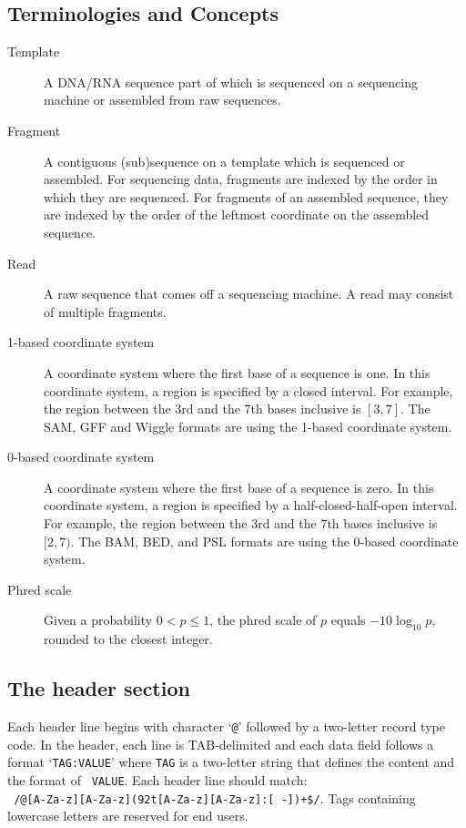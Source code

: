 \documentclass[10pt]{article}
\begin{document}
\subsection{Terminologies and Concepts}

\begin{description}
\item[Template] A DNA/RNA sequence part of which is sequenced on a
  sequencing machine or assembled from raw sequences.
\item[Fragment] A contiguous (sub)sequence on a template which is
  sequenced or assembled. For sequencing data, fragments are indexed by
  the order in which they are sequenced. For fragments of an assembled
  sequence, they are indexed by the order of the leftmost coordinate on
  the assembled sequence.
\item[Read] A raw sequence that comes off a sequencing machine. A read
  may consist of multiple fragments.
\item[1-based coordinate system] A coordinate system where the first
  base of a sequence is one. In this coordinate system, a region is
  specified by a closed interval. For example, the region between the
  3rd and the 7th bases inclusive is $[3,7]$. The SAM, GFF and Wiggle
  formats are using the 1-based coordinate system.
\item[0-based coordinate system] A coordinate system where the first
  base of a sequence is zero. In this coordinate system, a region is
  specified by a half-closed-half-open interval. For example, the region
  between the 3rd and the 7th bases inclusive is $[2,7)$. The BAM, BED,
  and PSL formats are using the 0-based coordinate system.
\item[Phred scale] Given a probability $0<p\le 1$, the phred scale of $p$
  equals $-10\log_{10}p$, rounded to the closest integer.
\end{description}

\subsection{The header section}
Each header line begins with character `{\tt @}' followed by a
two-letter record type code. In the header, each line is TAB-delimited
and each data field follows a format `{\tt TAG:VALUE}' where {\tt TAG}
is a two-letter string that defines the content and the format of {\tt
  VALUE}. Each header line should match:\\ {\tt
  /@[A-Za-z][A-Za-z](\char92t[A-Za-z][A-Za-z]:[
  -])+\$/}. Tags containing lowercase letters are reserved for
end users.
\end{document}
